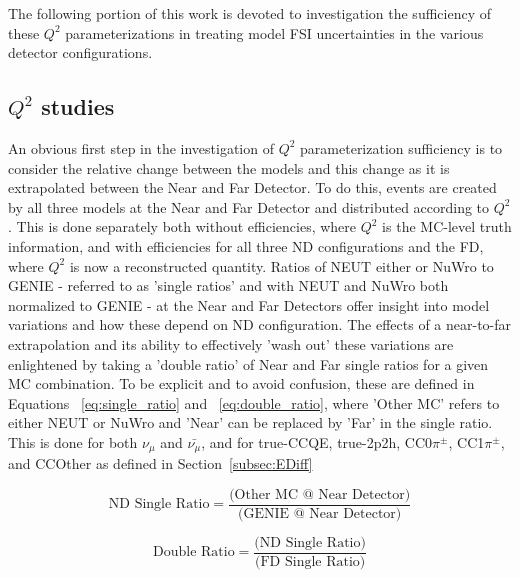 \documentclass[12pt]{article}
\begin{document}
The following portion of this work is devoted to investigation the sufficiency of these $Q^2$ parameterizations in treating model FSI uncertainties in the various detector configurations.

\subsection{$Q^2$ studies}
An obvious first step in the investigation of $Q^2$ parameterization sufficiency is to consider the relative change between the models and this change as it is extrapolated between the Near and Far Detector. To do this, events are created by all three models at the Near and Far Detector and distributed according to $Q^2$. This is done separately both without efficiencies, where $Q^2$ is the MC-level truth information, and with efficiencies for all three ND configurations and the FD, where $Q^2$ is now a reconstructed quantity. Ratios of NEUT either or NuWro to GENIE - referred to as 'single ratios' and with NEUT and NuWro both normalized to GENIE - at the Near and Far Detectors offer insight into model variations and how these depend on ND configuration. The effects of a near-to-far extrapolation and its ability to effectively 'wash out' these variations are enlightened by taking a 'double ratio' of Near and Far single ratios for a given MC combination. To be explicit and to avoid confusion, these are defined in Equations ~\ref{eq:single_ratio} and ~\ref{eq:double_ratio}, where 'Other MC' refers to either NEUT or NuWro and 'Near' can be replaced by 'Far' in the single ratio. This is done for both $\nu_{\mu}$ and $\bar{\nu_{\mu}}$, and for true-CCQE, true-2p2h, CC0$\pi^{\pm}$, CC1$\pi^{\pm}$, and CCOther as defined in Section~\ref{subsec:EDiff}

\begin{equation}
\label{eq:single_ratio}
\textrm{ND Single Ratio} = \frac{\textrm{(Other MC @ Near Detector)}}{\textrm{(GENIE @ Near Detector)}}
\end{equation}

\begin{equation}
\label{eq:double_ratio}
\textrm{Double Ratio} = \frac{\textrm{(ND Single Ratio)}}{\textrm{(FD Single Ratio)}}
\end{equation}
\end{document}
